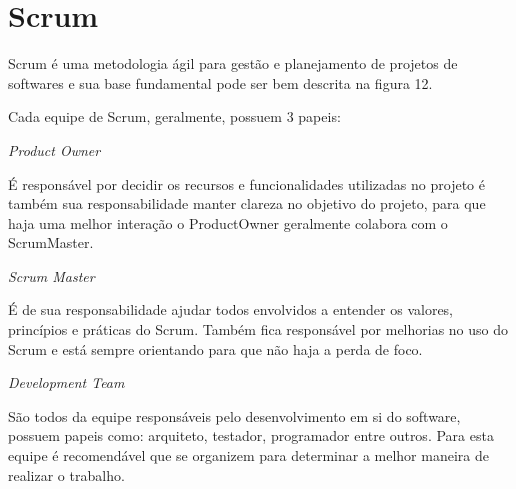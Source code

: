 \section{Scrum}
\label{sec:scrum}

Scrum é uma metodologia ágil para gestão e planejamento de projetos de softwares e sua base fundamental pode ser bem descrita na figura 12.

	\begin{figure}[h!]
		\centering
	\end{figure}

Cada equipe de Scrum, geralmente, possuem 3 papeis:
\begin{alineascomponto}
	\item \textit{Product Owner}
	
É responsável por decidir os recursos e funcionalidades utilizadas no projeto é também sua responsabilidade manter clareza no objetivo do projeto, para que haja uma melhor interação o ProductOwner geralmente colabora com o ScrumMaster.

	\item \textit{Scrum Master}
	
É de sua responsabilidade ajudar todos envolvidos a entender os valores, princípios e práticas do Scrum. Também fica responsável por melhorias no uso do Scrum e está sempre orientando para que não haja a perda de foco. 

	\item \textit{Development Team}
	
São todos da equipe responsáveis pelo desenvolvimento em si do software, possuem papeis como: arquiteto, testador, programador entre outros. Para esta equipe é recomendável que se organizem para determinar a melhor maneira de realizar o trabalho.
\pagebreak

	\end{alineascomponto}
	
